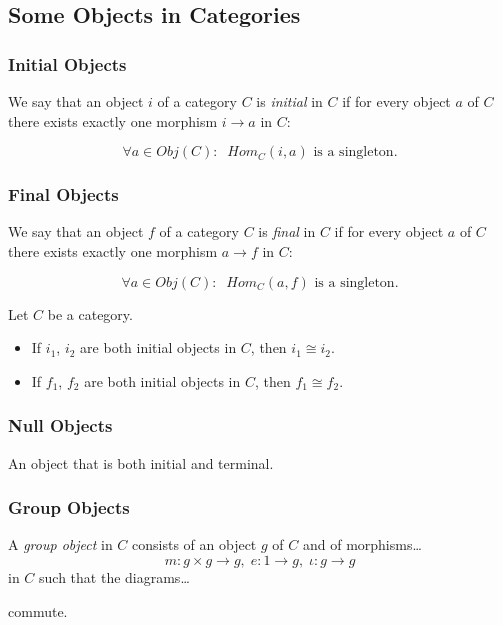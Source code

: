 \subsection{Some Objects in Categories}\label{someobjects}

\subsubsection{Initial Objects}\label{initial}

We say that an object $i$ of a category $C$ is \emph{initial} in $C$ if for every object $a$ of $C$ there exists exactly one morphism $i \rightarrow a$ in $C$:

$$\forall a \in Obj(C): \; \; Hom_C(i,a) \textrm{ is a singleton}.$$

\subsubsection{Final Objects}\label{final}

We say that an object $f$ of a category $C$ is \emph{final} in $C$ if for every object $a$ of $C$ there exists exactly one morphism $a \rightarrow f$ in $C$:

$$\forall a \in Obj(C): \; \; Hom_C(a,f) \textrm{ is a singleton}.$$

\begin{proposition}
Let $C$ be a category.
\begin{itemize}
  \item If $i_1$, $i_2$ are both initial objects in $C$, then $i_1 \cong i_2$.
  \item If $f_1$, $f_2$ are both initial objects in $C$, then $f_1 \cong f_2$.
\end{itemize}
\end{proposition}

\subsubsection{Null Objects}\label{null}

An object that is both initial and terminal.

\subsubsection{Group Objects}\label{groupobjects}

A \emph{group object} in $C$ consists of an object $g$ of $C$ and of morphisms\dots
$$m : g \times g \rightarrow g, \; e : 1 \rightarrow g, \; \iota : g \rightarrow g$$
in $C$ such that the diagrams\dots







commute.